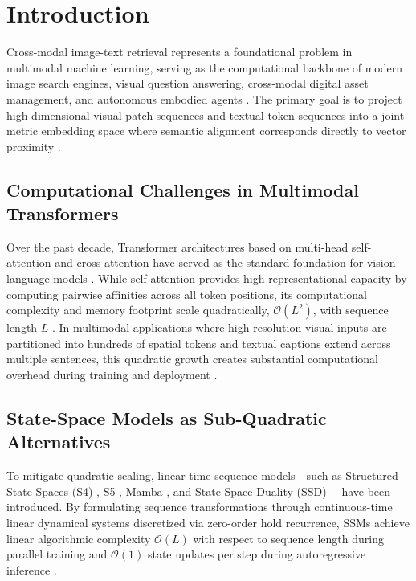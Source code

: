 \documentclass[pdflatex,sn-mathphys-num]{sn-jnl}%
\begin{document}

\maketitle

\section{Introduction}
\label{sec:introduction}
Cross-modal image-text retrieval represents a foundational problem in multimodal machine learning, serving as the computational backbone of modern image search engines, visual question answering, cross-modal digital asset management, and autonomous embodied agents \cite{radford2021learning,li2022blip,jia2021scaling}. The primary goal is to project high-dimensional visual patch sequences and textual token sequences into a joint metric embedding space where semantic alignment corresponds directly to vector proximity \cite{faghri2017vse++,lee2018stacked}.

\subsection{Computational Challenges in Multimodal Transformers}
Over the past decade, Transformer architectures based on multi-head self-attention and cross-attention have served as the standard foundation for vision-language models \cite{vaswani2017attention,dosovitskiy2020image,liu2019roberta}. While self-attention provides high representational capacity by computing pairwise affinities across all token positions, its computational complexity and memory footprint scale quadratically, $\mathcal{O}(L^2)$, with sequence length $L$ \cite{dao2022flashattention}. In multimodal applications where high-resolution visual inputs are partitioned into hundreds of spatial tokens and textual captions extend across multiple sentences, this quadratic growth creates substantial computational overhead during training and deployment \cite{li2023blip2,wang2023image}.

\subsection{State-Space Models as Sub-Quadratic Alternatives}
To mitigate quadratic scaling, linear-time sequence models---such as Structured State Spaces (S4) \cite{gu2021efficiently}, S5 \cite{smith2022simplified}, Mamba \cite{gu2023mamba}, and State-Space Duality (SSD) \cite{dao2024transformers}---have been introduced. By formulating sequence transformations through continuous-time linear dynamical systems discretized via zero-order hold recurrence, SSMs achieve linear algorithmic complexity $\mathcal{O}(L)$ with respect to sequence length during parallel training and $\mathcal{O}(1)$ state updates per step during autoregressive inference \cite{gu2020hippo,smith2022simplified}.
\end{document}
